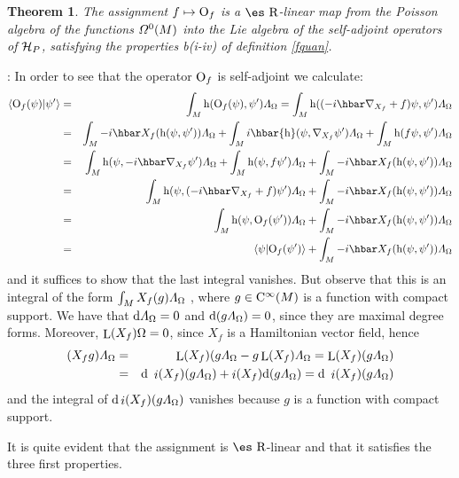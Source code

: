 \documentclass[12pt]{article}
\theoremstyle{plain}
\newtheorem{teor}{Theorem}
\def\beann{\begin{eqnarray*}}
\def\eeann{\end{eqnarray*}}
\def\dst{\(}
\def\d{{\rm d}}
\def\H{{\cal H}}
\def\Op{{\rm O}}
\def\h{{\rm h}}
\def\Real{\mbox{\es R}}
\def\inn{\mathop{i}\nolimits}
\def\Lie{\mathop{\rm L}\nolimits}
\def\Cinfty{{\rm C}^\infty}
\def\LF{{\mit\Lambda}_{\Omega}}
\begin{document}
\begin{teor}
The assignment $f \mapsto \Op_f$ is a $\Real$-linear map from
the Poisson algebra of the functions ${\mit\Omega}^0(M)$
into the Lie algebra of the self-adjoint operators of $\H_P$, satisfying
the properties
b(i-iv) of definition \ref{fquan}.
\label{prop}
\end{teor}
: 
In order to see that the operator $\Op_f$ is self-adjoint we calculate:
\beann
\langle \Op_f(\psi ) | \psi' \rangle
&=&
\int_M \h (\Op_f(\psi ),\psi') \LF
=
\int_M \h ((-i\hbar\nabla_{X_f}+f)\psi ,\psi ') \LF
\\
&=&
\int_M -i\hbar X_f(\h (\psi ,\psi ')) \LF
+ \int_M i\hbar \h (\psi ,\nabla_{X_f}\psi ') \LF
+ \int_M \h (f\psi ,\psi ') \LF
\\
&=&
\int_M \h (\psi ,-i\hbar\nabla_{X_f}\psi ') \LF
+ \int_M \h (\psi ,f\psi ') \LF
+ \int_M -i\hbar X_f( \h (\psi ,\psi ')) \LF
\\
&=&
\int_M \h (\psi ,(-i\hbar\nabla_{X_f}+f)\psi ') \LF
+ \int_M -i\hbar X_f(\h (\psi ,\psi ')) \LF
\\
&=&
\int_M \h (\psi ,\Op_f(\psi ')) \LF
+ \int_M -i\hbar X_f(\h (\psi ,\psi ')) \LF \\
&=&
\langle \psi | \Op_f(\psi ') \rangle
+ \int_M -i\hbar X_f(\h (\psi ,\psi ')) \LF
\eeann
and it suffices to show that the last integral vanishes.
But observe that  this is an integral of the form
\dst\int_M X_f(g) \LF\) , where
$g \in \Cinfty(M)$ is a function with compact support.
We have that $\d \LF = 0$ and $\d (g\LF ) = 0$,
since they are maximal degree forms.
Moreover, $\Lie(X_f)\Omega=0$, since $X_f$ is a Hamiltonian vector
field, hence
\beann
(X_fg) \LF
&=&
\Lie(X_f)(g\LF - g\Lie(X_f)\LF =\Lie(X_f)(g\LF )
\\ &=&
\d \ \inn(X_f)(g\LF )+ \inn(X_f)\d (g\LF )
=\d \ \inn(X_f)(g\LF )
\eeann
and the integral of
$\d\inn(X_f)(g\LF )$
vanishes because $g$ is a function with compact support.

It is quite evident that the assignment is $\Real$-linear and that it
satisfies the
three first properties.
\end{document}

